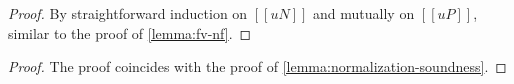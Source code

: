 \lemmaUVNF*
\begin{proof}
  By straightforward induction on $[[uN]]$ and mutually on $[[uP]]$, 
  similar to the proof of \cref{lemma:fv-nf}.
\end{proof}

\lemmaNormalizationSoundnessAlg*
\begin{proof}
  The proof coincides with the proof of \cref{lemma:normalization-soundness}.
\end{proof}
